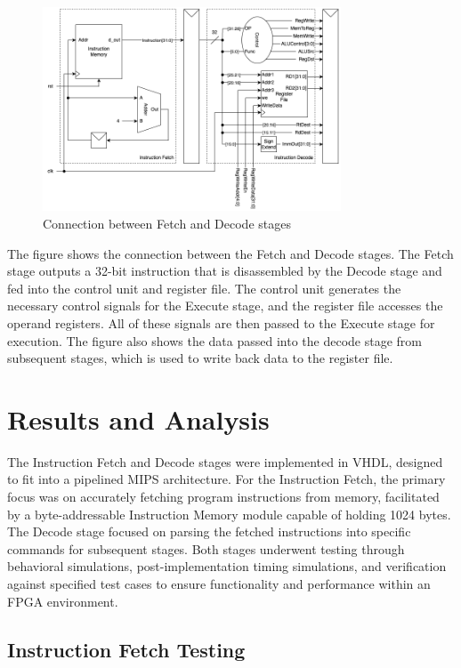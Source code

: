 \documentclass[CMPE]{../KGCOEReport}
\begin{document}
\begin{figure}[H]
    \centering
    \includegraphics[width=0.791\textwidth]{block_diagram.png}
    \caption{Connection between Fetch and Decode stages}
    \label{fig:fetch_decode}
\end{figure}

The figure shows the connection between the Fetch and Decode stages. The Fetch stage outputs a 32-bit instruction that is disassembled by the Decode stage and fed into the control unit and register file. The control unit generates the necessary control signals for the Execute stage, and the register file accesses the operand registers. All of these signals are then passed to the Execute stage for execution. The figure also shows the data passed into the decode stage from subsequent stages, which is used to write back data to the register file.

\section*{Results and Analysis}

The Instruction Fetch and Decode stages were implemented in VHDL, designed to fit into a pipelined MIPS architecture. For the Instruction Fetch, the primary focus was on accurately fetching program instructions from memory, facilitated by a byte-addressable Instruction Memory module capable of holding 1024 bytes. The Decode stage focused on parsing the fetched instructions into specific commands for subsequent stages. Both stages underwent testing through behavioral simulations, post-implementation timing simulations, and verification against specified test cases to ensure functionality and performance within an FPGA environment.

\subsection*{Instruction Fetch Testing}
\end{document}
